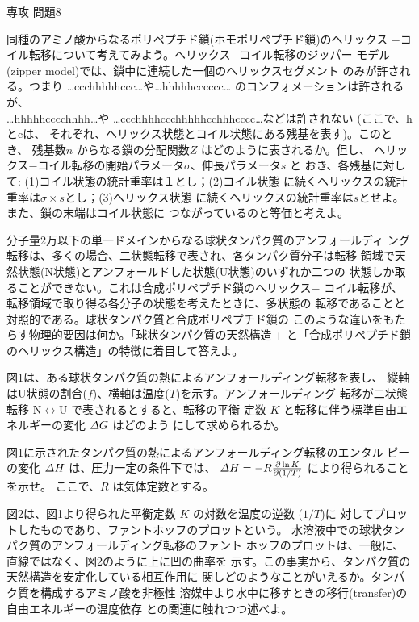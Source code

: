 \documentclass[fleqn]{jbook}
\begin{document}
\begin{question}{専攻 問題8}{}

\begin{subquestions}
\SubQuestion
  同種のアミノ酸からなるポリペプチド鎖(ホモポリペプチド鎖)のヘリックス
  −コイル転移について考えてみよう。ヘリックス−コイル転移のジッパー
  モデル(zipper model)では、鎖中に連続した一個のヘリックスセグメント
  のみが許される。つまり \mbox{…ccchhhhhccc…}や\mbox{…hhhhhcccccc…}
  のコンフォメーションは許されるが、\\\mbox{…hhhhhcccchhhh…}や
  \mbox{…ccchhhhccchhhhhcchhhcccc…}などは許されない (ここで、hとcは、
  それぞれ、ヘリックス状態とコイル状態にある残基を表す)。このとき、
  残基数$n$ からなる鎖の分配関数$Z$ はどのように表されるか。但し、
  ヘリックス−コイル転移の開始パラメータ$\sigma$、伸長パラメータ$s$ と
  おき、各残基に対して: (1)コイル状態の統計重率は１とし；(2)コイル状態
  に続くヘリックスの統計重率は$\sigma \times s$とし；(3)ヘリックス状態
  に続くヘリックスの統計重率は$s$とせよ。また、鎖の末端はコイル状態に
  つながっているのと等価と考えよ。

\SubQuestion
  分子量2万以下の単一ドメインからなる球状タンパク質のアンフォールディ
  ング転移は、多くの場合、二状態転移で表され、各タンパク質分子は転移
  領域で天然状態(N状態)とアンフォールドした状態(U状態)のいずれか二つの
  状態しか取ることができない。これは合成ポリペプチド鎖のヘリックス−
  コイル転移が、転移領域で取り得る各分子の状態を考えたときに、多状態の
  転移であることと対照的である。球状タンパク質と合成ポリペプチド鎖の
  このような違いをもたらす物理的要因は何か。「球状タンパク質の天然構造
  」と「合成ポリペプチド鎖のヘリックス構造」の特徴に着目して答えよ。

\SubQuestion
  図1は、ある球状タンパク質の熱によるアンフォールディング転移を表し、
  縦軸はU状態の割合($f$)、横軸は温度($T$)を示す。アンフォールディング
  転移が二状態転移 N$\leftrightarrow$U で表されるとすると、転移の平衡
  定数 $K$ と転移に伴う標準自由エネルギーの変化 ${\mit\Delta} G$ はどのよう   にして求められるか。

\SubQuestion
  図1に示されたタンパク質の熱によるアンフォールディング転移のエンタル
  ピーの変化 ${\mit\Delta} H$ は、圧力一定の条件下では、
  ${\mit\Delta} H =-R {\frac{\partial \ln K}{\partial (1/T)}}$ により得られることを示せ。
  ここで、$R$ は気体定数とする。

\SubQuestion
  図2は、図1より得られた平衡定数 $K$ の対数を温度の逆数 ($1/T$)に
  対してプロットしたものであり、ファントホッフのプロットという。
  水溶液中での球状タンパク質のアンフォールディング転移のファント
  ホッフのプロットは、一般に、直線ではなく、図2のように上に凹の曲率を
  示す。この事実から、タンパク質の天然構造を安定化している相互作用に
  関しどのようなことがいえるか。タンパク質を構成するアミノ酸を非極性
  溶媒中より水中に移すときの移行(transfer)の自由エネルギーの温度依存
  との関連に触れつつ述べよ。


\end{subquestions}
\end{question}
\end{document}
